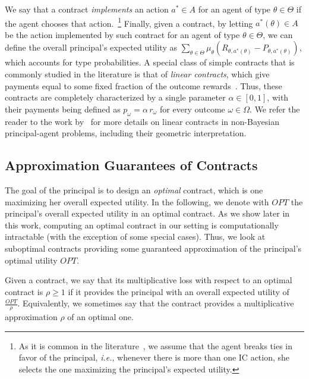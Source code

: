 We say that a contract \emph{implements} an action $a^\ast \in A$ for an agent of type $\theta \in \Theta$ if the agent chooses that action.~\footnote{As it is common in the literature~\citep{dutting2020complexity}, we assume that the agent breaks ties in favor of the principal, \emph{i.e.}, whenever there is more than one IC action, she selects the one maximizing the principal's expected utility.}
%
Finally, given a contract, by letting $a^\ast(\theta) \in A$ be the action implemented by such contract for an agent of type $\theta \in \Theta$, we can define the overall principal's expected utility as $ \sum_{\theta \in \Theta} \mu_\theta \left( R_{\theta,a^\ast (\theta)} -P_{\theta,a^\ast (\theta)} \right)$, which accounts for type probabilities.
%
%
A special class of simple contracts that is commonly studied in the literature is that of \emph{linear contracts}, which give payments equal to some fixed fraction of the outcome rewards~\citep{dutting2019simple}.
%
Thus, these contracts are completely characterized by a single parameter $\alpha \in [0,1]$, with their payments being defined as $p_\omega = \alpha \, r_\omega$ for every outcome $\omega \in \Omega$.
%
We refer the reader to the work by~\citet{dutting2019simple} for more details on linear contracts in non-Bayesian principal-agent problems, including their geometric interpretation. 



\subsection{Approximation Guarantees of Contracts}\label{sec:preliminaries_apx}


The goal of the principal is to design an \emph{optimal} contract, which is one maximizing her overall expected utility.
%
In the following, we denote with $OPT$ the principal's overall expected utility in an optimal contract.
%
As we show later in this work, computing an optimal contract in our setting is computationally intractable (with the exception of some special cases).
%
Thus, we look at suboptimal contracts providing some guaranteed approximation of the principal's optimal utility $OPT$.


Given a contract, we say that its {multiplicative loss} with respect to an optimal contract is $\rho \geq 1$ if it provides the principal with an overall expected utility of $\frac{OPT}{\rho}$.
%
Equivalently, we sometimes say that the contract provides a multiplicative approximation $\rho$ of an optimal one.
%


